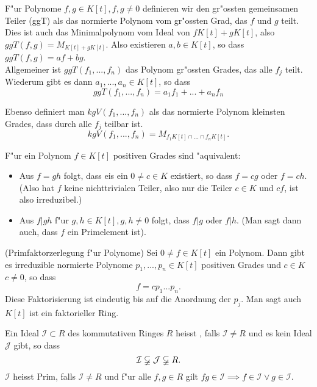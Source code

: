 \documentclass[8pt, a4paper, twocolumn, landscape]{article}
\begin{document}
{ 
 \begin{definition}
 F"ur Polynome $f, g \in K[t], f, g \neq 0$ definieren wir den gr"ossten gemeinsamen Teiler (ggT) als das normierte Polynom vom gr"ossten Grad, das $f$ und $g$ teilt. Dies ist auch das Minimalpolynom vom Ideal von $f K[t] + g K[t]$, also $ggT(f, g) = M_{ K[t] + g K[t]}.$
 Also existieren $a, b \in K[t]$, so dass $ggT(f, g) = af + bg$.
 \\
 Allgemeiner ist $ggT(f_1, ..., f_n)$ das Polynom gr"ossten Grades, das alle $f_j$ teilt. Wiederum gibt es dann $a_1, ..., a_n \in K[t]$, so dass 
 $$
 ggT(f_1, ..., f_n) = a_1 f_1 + ... + a_n f_n
 $$
 
 Ebenso definiert man $kgV(f_1, ..., f_n)$ als das normierte Polynom kleinsten Grades, dass durch alle $f_j$ teilbar ist. 
 $$
 kgV(f_1, ..., f_n) = M_{f_1K[t] \cap ... \cap f_n K[t]}.$$
 \end{definition}
 
 \begin{lemma}
 F"ur ein Polynom $f \in K[t]$ positiven Grades sind "aquivalent:
\begin{itemize}
\item Aus $f = gh$ folgt, dass eis ein $0 \neq c \in K$ existiert, so dass $f = cg$ oder $f = ch$. (Also hat $f$ keine nichttrivialen Teiler, also nur die Teiler $c \in K$ und $cf$, ist also irreduzibel.)
\item Aus $f|gh$ f"ur $g, h \in K[t], g, h \neq 0$ folgt, dass $f|g$ oder $f|h$. (Man sagt dann auch, dass $f$ ein Primelement ist).
\end{itemize}
 \end{lemma}
 
 
 
 \begin{theorem} (Primfaktorzerlegung f"ur Polynome)
 Sei $0 \neq f \in K[t]$ ein Polynom. Dann gibt es irreduzible normierte Polynome $p_1, ..., p_n \in K[t]$ positiven Grades und $c \in K$ $c\neq 0$, so dass
 $$
 f = cp_1 ... p_n.
 $$
 Diese Faktorisierung ist eindeutig bis auf die Anordnung der $p_j$.
 Man sagt auch $K[t]$ ist ein faktorieller Ring.
 \end{theorem}
 
 
 
 \begin{definition}
 Ein Ideal $\mathcal{I} \subset R$ des kommutativen Ringes $R$ heisst , falls $\mathcal{I} \neq R$ und es kein Ideal $\mathcal{J}$ gibt, so dass 
 $$
\mathcal{I} \varsubsetneqq \mathcal{J} \varsubsetneqq R.
 $$
 $\mathcal{I}$ heisst Prim, falls $\mathcal{I} \neq R$ und f"ur alle $f, g \in R$ gilt $fg \in \mathcal{I} \implies
  f \in \mathcal{I} \vee g \in \mathcal{I}$.
 \end{definition}
 
}
\end{document}
